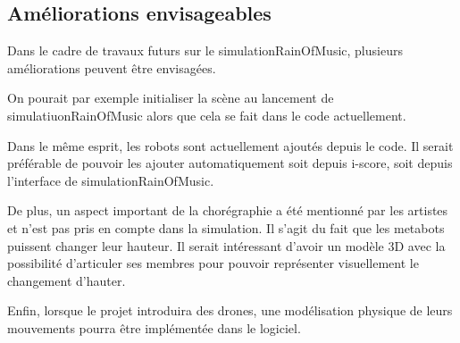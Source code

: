 \subsection{Améliorations envisageables}

Dans le cadre de travaux futurs sur le simulationRainOfMusic, plusieurs améliorations peuvent être envisagées.

On pourait par exemple initialiser la scène au lancement de simulatiuonRainOfMusic alors que cela se fait dans le code actuellement.

Dans le même esprit, les robots sont actuellement ajoutés depuis le code. Il serait préférable de pouvoir les ajouter automatiquement soit depuis i-score, soit depuis l'interface de simulationRainOfMusic.  

De plus, un aspect important de la chorégraphie a été mentionné par les artistes et n'est pas pris en compte dans la simulation. Il s'agit du fait que les metabots puissent changer leur hauteur. Il serait intéressant d'avoir un modèle 3D avec la possibilité d'articuler ses membres pour pouvoir représenter visuellement le changement d'hauter.

Enfin, lorsque le projet introduira des drones, une modélisation physique de leurs mouvements pourra être implémentée dans le logiciel.

